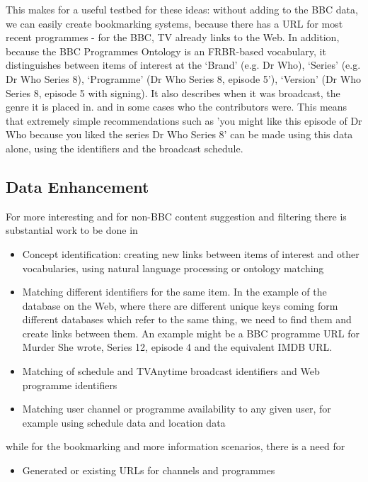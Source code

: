 \documentclass[]{article}%
\begin{document}
This makes for a useful testbed for these ideas: without adding to the BBC data, we can easily create bookmarking systems, because there has a URL for most recent programmes - for the BBC, TV already links to the Web. In addition, because the BBC Programmes Ontology is an FRBR-based vocabulary, it distinguishes between items of interest at the `Brand' (e.g. Dr Who), `Series' (e.g. Dr Who Series 8), `Programme' (Dr Who Series 8, episode 5'), `Version'  (Dr Who Series 8, episode 5 with signing). It also describes when it was broadcast, the genre it is placed in. and in some cases who the contributors were. This means that extremely simple recommendations such as 'you might like this episode of Dr Who because you liked the series Dr Who Series 8' can be made using this data alone, using the identifiers and the broadcast schedule.

\subsection{Data Enhancement}

For more interesting and for non-BBC content suggestion and filtering there is substantial work to be done in 

\begin{itemize}
\item{Concept identification: creating new links between items of interest and other vocabularies, using natural language processing or ontology matching}
\item{Matching different identifiers for the same item. In the example of the database on the Web, where there are different unique keys coming form different databases which refer to the same thing, we need to find them and create links between them. An example might be a BBC programme URL for Murder She wrote, Series 12, episode 4 and the equivalent IMDB URL.}
\item{Matching of schedule and TVAnytime broadcast identifiers and Web programme identifiers}
\item{Matching user channel or programme availability to any given user, for example using schedule data and location data} 
\end{itemize}

while for the bookmarking and more information scenarios, there is a need for

\begin{itemize}
\item{Generated or existing URLs for channels and programmes}
\end{itemize}
\end{document}
